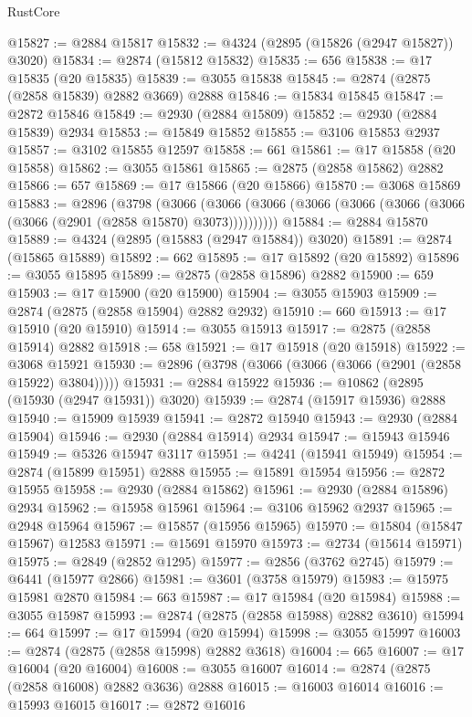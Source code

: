\begin{lexlean}{RustCore}
\begin{coremodule}
@15827 := @2884 @15817
@15832 := @4324 (@2895 (@15826 (@2947 @15827)) @3020)
@15834 := @2874 (@15812 @15832)
@15835 := 656
@15838 := @17 @15835 (@20 @15835)
@15839 := @3055 @15838
@15845 := @2874 (@2875 (@2858 @15839) @2882 @3669) @2888
@15846 := @15834 @15845
@15847 := @2872 @15846
@15849 := @2930 (@2884 @15809)
@15852 := @2930 (@2884 @15839) @2934
@15853 := @15849 @15852
@15855 := @3106 @15853 @2937
@15857 := @3102 @15855 @12597
@15858 := 661
@15861 := @17 @15858 (@20 @15858)
@15862 := @3055 @15861
@15865 := @2875 (@2858 @15862) @2882
@15866 := 657
@15869 := @17 @15866 (@20 @15866)
@15870 := @3068 @15869
@15883 := @2896
    (@3798
      (@3066 (@3066 (@3066 (@3066 (@3066 (@3066 (@3066 (@3066 (@2901 (@2858 @15870) @3073))))))))))
@15884 := @2884 @15870
@15889 := @4324 (@2895 (@15883 (@2947 @15884)) @3020)
@15891 := @2874 (@15865 @15889)
@15892 := 662
@15895 := @17 @15892 (@20 @15892)
@15896 := @3055 @15895
@15899 := @2875 (@2858 @15896) @2882
@15900 := 659
@15903 := @17 @15900 (@20 @15900)
@15904 := @3055 @15903
@15909 := @2874 (@2875 (@2858 @15904) @2882 @2932)
@15910 := 660
@15913 := @17 @15910 (@20 @15910)
@15914 := @3055 @15913
@15917 := @2875 (@2858 @15914) @2882
@15918 := 658
@15921 := @17 @15918 (@20 @15918)
@15922 := @3068 @15921
@15930 := @2896 (@3798 (@3066 (@3066 (@3066 (@2901 (@2858 @15922) @3804)))))
@15931 := @2884 @15922
@15936 := @10862 (@2895 (@15930 (@2947 @15931)) @3020)
@15939 := @2874 (@15917 @15936) @2888
@15940 := @15909 @15939
@15941 := @2872 @15940
@15943 := @2930 (@2884 @15904)
@15946 := @2930 (@2884 @15914) @2934
@15947 := @15943 @15946
@15949 := @5326 @15947 @3117
@15951 := @4241 (@15941 @15949)
@15954 := @2874 (@15899 @15951) @2888
@15955 := @15891 @15954
@15956 := @2872 @15955
@15958 := @2930 (@2884 @15862)
@15961 := @2930 (@2884 @15896) @2934
@15962 := @15958 @15961
@15964 := @3106 @15962 @2937
@15965 := @2948 @15964
@15967 := @15857 (@15956 @15965)
@15970 := @15804 (@15847 @15967) @12583
@15971 := @15691 @15970
@15973 := @2734 (@15614 @15971)
@15975 := @2849 (@2852 @1295)
@15977 := @2856 (@3762 @2745)
@15979 := @6441 (@15977 @2866)
@15981 := @3601 (@3758 @15979)
@15983 := @15975 @15981 @2870
@15984 := 663
@15987 := @17 @15984 (@20 @15984)
@15988 := @3055 @15987
@15993 := @2874 (@2875 (@2858 @15988) @2882 @3610)
@15994 := 664
@15997 := @17 @15994 (@20 @15994)
@15998 := @3055 @15997
@16003 := @2874 (@2875 (@2858 @15998) @2882 @3618)
@16004 := 665
@16007 := @17 @16004 (@20 @16004)
@16008 := @3055 @16007
@16014 := @2874 (@2875 (@2858 @16008) @2882 @3636) @2888
@16015 := @16003 @16014
@16016 := @15993 @16015
@16017 := @2872 @16016

\end{coremodule}
\end{lexlean}
